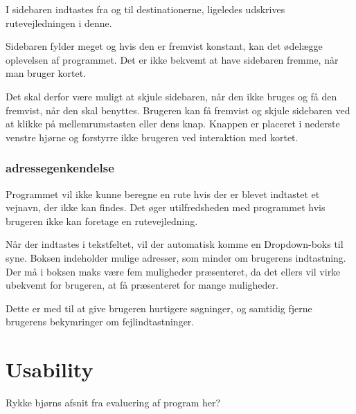 I sidebaren indtastes fra og til destinationerne, ligeledes udskrives rutevejledningen i denne. 

Sidebaren fylder meget og hvis den er fremvist konstant, kan det ødelægge oplevelsen af programmet. Det er ikke bekvemt at have sidebaren fremme, når man bruger kortet. 

Det skal derfor være muligt at skjule sidebaren, når den ikke bruges og få den fremvist, når den skal benyttes. Brugeren kan få fremvist og skjule sidebaren ved at klikke på mellemrumstasten eller dens knap. Knappen er placeret i nederste venstre hjørne og forstyrre ikke brugeren ved interaktion med kortet.

\subsubsection{adressegenkendelse}

Programmet vil ikke kunne beregne en rute hvis der er blevet indtastet et vejnavn, der ikke kan findes. Det øger utilfredsheden med programmet hvis brugeren ikke kan foretage en rutevejledning. 

Når der indtastes i tekstfeltet, vil der automatisk komme en Dropdown-boks til syne. Boksen indeholder mulige adresser, som minder om brugerens indtastning. Der må i boksen maks være fem muligheder præsenteret, da det ellers vil virke ubekvemt for brugeren, at få præsenteret for mange muligheder.

Dette er med til at give brugeren hurtigere søgninger, og samtidig fjerne brugerens bekymringer om fejlindtastninger.

\section{Usability}
Rykke bjørns afsnit fra evaluering af program her?